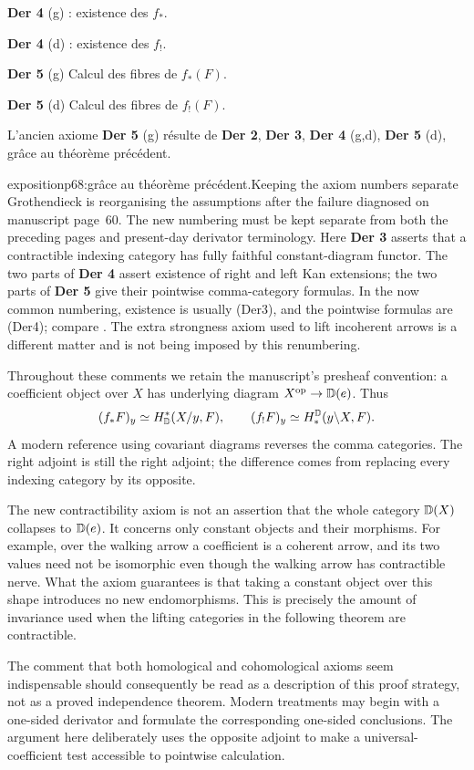 \noindent\textbf{Der 4} (g) : existence des $f_*$.

\noindent\textbf{Der 4} (d) : existence des $f_!$.

\noindent\textbf{Der 5} (g) Calcul des fibres de $f_*(F)$.

\noindent\textbf{Der 5} (d) Calcul des fibres de $f_!(F)$.

\noindent L'ancien axiome \textbf{Der 5} (g) résulte de \textbf{Der 2}, \textbf{Der 3}, \textbf{Der 4} (g,d), \textbf{Der 5} (d), grâce au théorème précédent.

\begin{dcomment}{exposition}{p68:grâce au théorème précédent.}{Keeping the axiom numbers separate}
Grothendieck is reorganising the assumptions after the failure diagnosed on manuscript page~60. The new numbering must be kept separate from both the preceding pages and present-day derivator terminology. Here \textbf{Der 3} asserts that a contractible indexing category has fully faithful constant-diagram functor. The two parts of \textbf{Der 4} assert existence of right and left Kan extensions; the two parts of \textbf{Der 5} give their pointwise comma-category formulas. In the now common numbering, existence is usually (Der3), and the pointwise formulas are (Der4); compare \citet[Definition~1.5]{Groth2013}. The extra strongness axiom used to lift incoherent arrows is a different matter and is not being imposed by this renumbering.

Throughout these comments we retain the manuscript's presheaf convention: a coefficient object over $X$ has underlying diagram $X^{\mathrm{op}}\to\mathbb{D}(e)$. Thus
\[
 (f_*F)_y\simeq H^*_{\mathbb{D}}(X/y,F),\qquad
 (f_!F)_y\simeq H^{\mathbb{D}}_*(y\backslash X,F).
\]
A modern reference using covariant diagrams reverses the comma categories. The right adjoint is still the right adjoint; the difference comes from replacing every indexing category by its opposite.

The new contractibility axiom is not an assertion that the whole category $\mathbb{D}(X)$ collapses to $\mathbb{D}(e)$. It concerns only constant objects and their morphisms. For example, over the walking arrow a coefficient is a coherent arrow, and its two values need not be isomorphic even though the walking arrow has contractible nerve. What the axiom guarantees is that taking a constant object over this shape introduces no new endomorphisms. This is precisely the amount of invariance used when the lifting categories in the following theorem are contractible.

The comment that both homological and cohomological axioms seem indispensable should consequently be read as a description of this proof strategy, not as a proved independence theorem. Modern treatments may begin with a one-sided derivator and formulate the corresponding one-sided conclusions. The argument here deliberately uses the opposite adjoint to make a universal-coefficient test accessible to pointwise calculation.
\end{dcomment}


